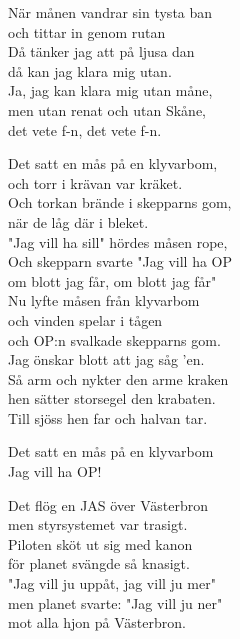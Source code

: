 \documentclass[a6paper, 10pt, twoside]{article}
\begin{document}
\noindent
\begin{center}
\end{center}
\begin{lyrics}
När månen vandrar sin tysta ban \\
och tittar in genom rutan \\
Då tänker jag att på ljusa dan \\
då kan jag klara mig utan. \\
Ja, jag kan klara mig utan måne, \\
men utan renat och utan Skåne, \\
det vete f-n, det vete f-n. 
\end{lyrics}
\begin{center}
\end{center}
\begin{lyrics}
Det satt en mås på en klyvarbom, \\
och torr i krävan var kräket. \\
Och torkan brände i skepparns gom, \\
när de låg där i bleket. \\
"Jag vill ha sill" hördes måsen rope, \\
Och skepparn svarte "Jag vill ha OP \\
om blott jag får, om blott jag får" 
\vspace{5pt}\\
Nu lyfte måsen från klyvarbom \\
och vinden spelar i tågen \\
och OP:n svalkade skepparns gom. \\
Jag önskar blott att jag såg 'en. \\
Så arm och nykter den arme kraken \\
hen sätter storsegel den krabaten. \\
Till sjöss hen far och halvan tar. 
\end{lyrics}

\begin{center}
\end{center}
\begin{lyrics}
Det satt en mås på en klyvarbom\\
Jag vill ha OP! 
\end{lyrics}

\newpage
\noindent
\begin{center}
\end{center}
\begin{lyrics}
Det flög en JAS över Västerbron \\
men styrsystemet var trasigt. \\
Piloten sköt ut sig med kanon \\
för planet svängde så knasigt. \\
"Jag vill ju uppåt, jag vill ju mer"\\
men planet svarte: "Jag vill ju ner"\\
mot alla hjon på Västerbron. 
\end{lyrics}
\end{document}
